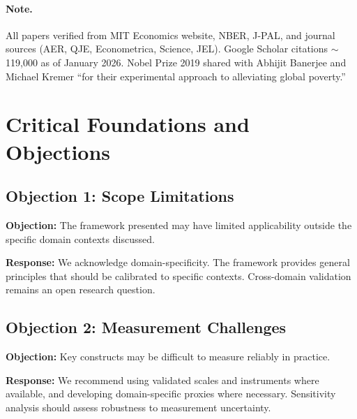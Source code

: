 \paragraph{Note.} 
All papers verified from MIT Economics website, NBER, J-PAL, and journal
sources (AER, QJE, Econometrica, Science, JEL). Google Scholar citations $\sim$119,000
as of January 2026. Nobel Prize 2019 shared with Abhijit Banerjee and Michael Kremer
``for their experimental approach to alleviating global poverty.''




\section{Critical Foundations and Objections}
\label{sec:duf-foundations}

\subsection{Objection 1: Scope Limitations}

\textbf{Objection:} The framework presented may have limited applicability
outside the specific domain contexts discussed.

\textbf{Response:} We acknowledge domain-specificity. The framework provides
general principles that should be calibrated to specific contexts. Cross-domain
validation remains an open research question.

\subsection{Objection 2: Measurement Challenges}

\textbf{Objection:} Key constructs may be difficult to measure reliably in
practice.

\textbf{Response:} We recommend using validated scales and instruments where
available, and developing domain-specific proxies where necessary. Sensitivity
analysis should assess robustness to measurement uncertainty.





